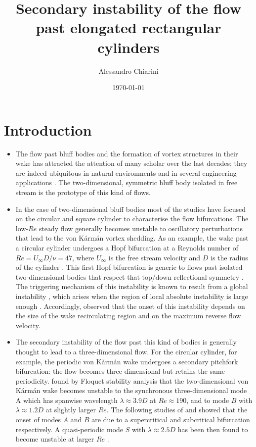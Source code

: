 \documentclass[onecolumn,notitlepage,superscriptaddress, amsmath,amssymb,longbibliographyaps,floatfix]{revtex4-1}
\begin{document}
\title{Secondary instability of the flow past elongated rectangular cylinders}
\author{Alessandro Chiarini}
\date{\today}
\maketitle

\section{Introduction}

\begin{itemize}
  \item The flow past bluff bodies and the formation of vortex structures in their wake has attracted the attention of many scholar over the last decades; they are indeed ubiquitous in natural environments and in several engineering applications \citep{oertel-1990,williamson-1996b,choi-etal-2008,thompson-etal-2021}. The two-dimensional, symmetric bluff body isolated in free stream is the prototype of this kind of flows.
  \item In the case of two-dimensional bluff bodies most of the studies have focused on the circular and square cylinder to characterise the flow bifurcations. The low-$Re$ steady flow generally becomes unstable to oscillatory perturbations that lead to the von K\'{a}rm\'{a}n vortex shedding. As an example, the wake past a circular cylinder undergoes a Hopf bifurcation at a Reynolds number of $Re = U_\infty D /\nu = 47$, where $U_\infty$ is the free stream velocity and $D$ is the radius of the cylinder \cite{noack-eckelmann-1994}. This first Hopf bifurcation is generic to flows past isolated two-dimensional bodies that respect that top/down reflectional symmetry \citep{jackson-1987}. The triggering mechanism of this instability is known to result from a global instability \citep{jackson-1987}, which arises when the region of local absolute instability is large enough \citep{chomaz-2005}. Accordingly, \cite{chiarini-quadrio-auteri-2022} observed that the onset of this instability depends on the size of the wake recirculating region and on the maximum reverse flow velocity.
  \item The secondary instability of the flow past this kind of bodies is generally thought to lead to a three-dimensional flow. For the circular cylinder, for example, the periodic von K\'{a}rm\'{a}n wake undergoes a secondary pitchfork bifurcation: the flow becomes three-dimensional but retains the same periodicity. \cite{barkley-henderson-1997} found by Floquet stability analysis that the two-dimensional von K\'{a}rm\'{a}n wake becomes unstable to the synchronous three-dimensional mode A which has spanwise wavelength $\lambda \approx 3.9 D$ at $Re \approx 190$, and to mode $B$ with $\lambda \approx 1.2 D$ at slightly larger $Re$. The following studies of \cite{henderson-barkley-1996} and \cite{henderson-1997} showed that the onset of modes $A$ and $B$ are due to a supercritical and subcritical bifurcation respectively. A quasi-periodic mode $S$ with $\lambda \approx 2.5D$ has been then found to become unstable at larger $Re$ \citep{blackburn-lopez-2003,blackburn-etal-2005,blackburn-sheard-2010}. 

\end{itemize}
\end{document}
